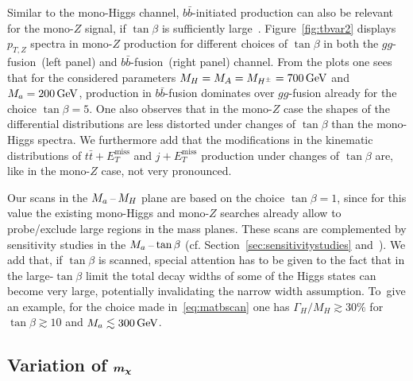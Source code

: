 \documentclass[a4paper, 11pt,notoc]{article}
\newcommand{\MET}{\ensuremath{E_T^\mathrm{miss}}\xspace}
\newcommand{\mA}{\ensuremath{M_{A}}\xspace}
\newcommand{\ma}{\ensuremath{M_{a}}\xspace}
\newcommand{\mH}{\ensuremath{M_{H}}\xspace}
\newcommand{\mHc}{\ensuremath{M_{H^{\pm}}}\xspace}
\def\bm#1{\mbox{\boldmath$#1$\unboldmath}}
\begin{document}
{\color{blue} Similar to the mono-Higgs channel, $b \bar b$-initiated production can also be relevant for the mono-$Z$ signal,  if $\tan \beta$ is sufficiently large~\cite{Bauer:2017ota}.} Figure~\ref{fig:tbvar2} displays $p_{T,Z}$ spectra in mono-$Z$ production for different choices of $\tan \beta$ in both the $gg$-fusion~(left panel) and $b \bar b$-fusion~(right panel) channel.  From the plots one sees that for the considered parameters $\mH = \mA = \mHc = 700 \, {\rm GeV}$ and $\ma = 200 \, {\rm GeV}$,  production in $b \bar b$-fusion dominates over $gg$-fusion already for the choice $\tan \beta = 5$. One also observes that  in the mono-$Z$ case   the shapes of the differential distributions are less distorted under changes of $\tan \beta$ than the mono-Higgs spectra. {\color{blue} We furthermore  add that the modifications in the kinematic distributions of $t \bar t + \MET$ and $j +\MET$ production under changes of $\tan \beta$ are, like in the mono-$Z$ case, not very pronounced.}

Our  scans in the $M_{a}\hspace{0.5mm}$--$\hspace{0.5mm} M_H$ plane are based on the choice $\tan \beta = 1$, since for this value the existing mono-Higgs and mono-$Z$ searches already allow to probe/exclude large regions in the mass planes.  These  scans are complemented by sensitivity studies in the $\ma \hspace{0.5mm}$--$\hspace{0.5mm} \tan \beta$ (cf. Section~\ref{sec:sensitivitystudies} and~\cite{No:2015xqa,Bauer:2017ota,Pani:2017qyd}).  We add that, if $\tan \beta$ is scanned, special attention has to be given to the fact that in the large-$\tan \beta$ limit the total decay widths of some of the Higgs states can become very large, potentially invalidating the narrow width assumption.  {\color{blue} To~give an example, for the choice made in~\eqref{eq:matbscan} one has $\Gamma_{H}/M_H \gtrsim 30\%$ for $\tan \beta \gtrsim 10$ and $M_a \lesssim 300 \, {\rm GeV}$. }

\subsection*{Variation of $\bm{m_\chi}$}
\end{document}
